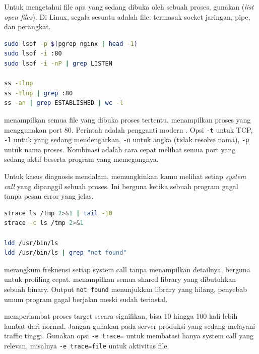 Untuk mengetahui file apa yang sedang dibuka oleh sebuah proses, gunakan
 (\emph{list open files}). Di Linux, segala sesuatu adalah file:
termasuk socket jaringan, pipe, dan perangkat.

\begin{lstlisting}[language=bash, caption={Memantau file terbuka dan koneksi jaringan}]
sudo lsof -p $(pgrep nginx | head -1)
sudo lsof -i :80
sudo lsof -i -nP | grep LISTEN

ss -tlnp
ss -tlnp | grep :80
ss -an | grep ESTABLISHED | wc -l
\end{lstlisting}

 menampilkan semua file yang dibuka proses tertentu.  menampilkan proses yang menggunakan port 80. Perintah  adalah
pengganti modern . Opsi \texttt{-t} untuk TCP, \texttt{-l} untuk
yang sedang mendengarkan, \texttt{-n} untuk angka (tidak resolve nama), \texttt{-p}
untuk nama proses. Kombinasi  adalah cara cepat melihat semua
port yang sedang aktif beserta program yang memegangnya.

Untuk kasus diagnosis mendalam,  memungkinkan kamu melihat setiap
\emph{system call} yang dipanggil sebuah proses. Ini berguna ketika sebuah program
gagal tanpa pesan error yang jelas.

\begin{lstlisting}[language=bash, caption={Analisis mendalam dengan strace dan ldd}]
strace ls /tmp 2>&1 | tail -10
strace -c ls /tmp 2>&1

ldd /usr/bin/ls
ldd /usr/bin/ls | grep "not found"
\end{lstlisting}

 merangkum frekuensi setiap system call tanpa menampilkan detailnya,
berguna untuk profiling cepat.  menampilkan semua shared library yang
dibutuhkan sebuah binary. Output \texttt{not found} menunjukkan library yang
hilang, penyebab umum program gagal berjalan meski sudah terinstal.

\begin{warningbox}
 memperlambat proses target secara signifikan, bisa 10 hingga 100
kali lebih lambat dari normal. Jangan gunakan pada server produksi yang sedang
melayani traffic tinggi. Gunakan opsi \texttt{-e trace=} untuk membatasi hanya
system call yang relevan, misalnya \texttt{-e trace=file} untuk aktivitas file.
\end{warningbox}

